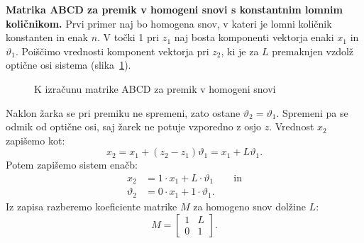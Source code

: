 \begin{example}
\label{ex:ML}
{\bf Matrika ABCD za premik v homogeni snovi s konstantnim lomnim količnikom.} 
Prvi primer naj bo homogena snov, v kateri je lomni količnik konstanten in enak $n$. 
V točki 1 pri $z_1$ naj bosta komponenti vektorja enaki $x_1$ in 
$\vartheta_1$. Poiščimo vrednosti komponent vektorja pri $z_2$, ki je 
za $L$ premaknjen vzdolž optične osi sistema 
(slika~\ref{fig:01_ABCD1}). 
\begin{figure}[ht]
\centering
\def\svgwidth{70truemm} 

\caption{K izračunu matrike ABCD za premik v homogeni snovi}
\label{fig:01_ABCD1}
\end{figure}

Naklon žarka se pri premiku ne spremeni, zato ostane $\vartheta_2 = \vartheta_1$. Spremeni
pa se odmik od optične osi, saj žarek ne potuje vzporedno z osjo $z$. 
Vrednost $x_2$ zapišemo kot:
\begin{equation}
 x_2 = x_1 + (z_2-z_1)\vartheta_1 = x_1 + L\vartheta_1.
\label{eq:02_32}
\end{equation}
Potem zapišemo sistem enačb:
\begin{align}
 x_2 &= 1\cdot x_1 + L\cdot \vartheta_1 \qquad \mathrm{in} \label{eq:02_33}\\
 \vartheta_2 &= 0\cdot x_1 + 1\cdot \vartheta_1.
 \label{eq:02_34}
\end{align}
Iz zapisa razberemo koeficiente matrike $M$ za homogeno snov dolžine $L$:
\begin{equation}
 M = \left[\begin{array}{cc}
1& L\\
0&1
\end{array}\right]\!\!.
 \label{eq:02_35}
\end{equation}
\end{example}

